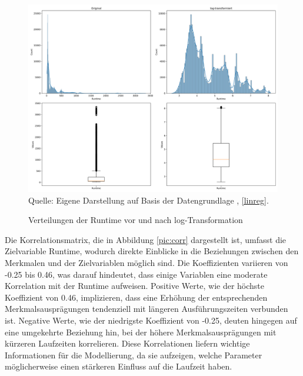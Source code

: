 \begin{figure}[!h]
    \caption{Verteilungen der Runtime vor und nach log-Transformation}
    \includegraphics[width=1\textwidth]{../scripts/images/combined_runtime_plots.png}
    Quelle: Eigene Darstellung auf Basis der Datengrundlage \cite{misc_sgemm_gpu_kernel_performance_440}, \ref{linreg}.
    \label{pic:box}
\end{figure}

Die Korrelationsmatrix, die in Abbildung \ref{pic:corr} dargestellt ist, 
umfasst die Zielvariable Runtime, wodurch direkte Einblicke in die Beziehungen 
zwischen den Merkmalen und der Zielvariablen möglich sind. Die Koeffizienten variieren 
von -0.25 bis 0.46, was darauf hindeutet, dass einige Variablen eine moderate 
Korrelation mit der Runtime aufweisen. Positive Werte, wie der höchste Koeffizient 
von 0.46, implizieren, dass eine Erhöhung der entsprechenden Merkmalsausprägungen tendenziell 
mit längeren Ausführungszeiten verbunden ist. Negative Werte, wie der niedrigste Koeffizient 
von -0.25, deuten hingegen auf eine umgekehrte Beziehung hin, 
bei der höhere Merkmalsausprägungen mit kürzeren Laufzeiten korrelieren. 
Diese Korrelationen liefern wichtige Informationen für die Modellierung, da sie aufzeigen, 
welche Parameter möglicherweise einen stärkeren Einfluss auf die Laufzeit haben. 

